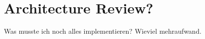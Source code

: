 \section{Architecture Review?}
\begin{frame}
	Was musste ich noch alles implementieren?
	Wieviel mehraufwand.
\end{frame}
